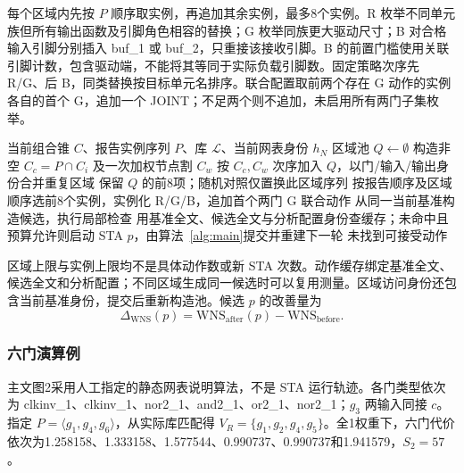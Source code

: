\documentclass[twocolumn,10pt,fontset=windows]{ctexart}
\renewcommand{\eqref}[1]{\textup{（\ref{#1}）}}
\begin{document}
每个区域内先按 $P$ 顺序取实例，再追加其余实例，最多8个实例。R 枚举不同单元族但所有输出函数及引脚角色相容的替换；G 枚举同族更大驱动尺寸；B 对合格输入引脚分别插入 buf\_1 或 buf\_2，只重接该接收引脚。B 的前置门槛使用关联引脚计数，包含驱动端，不能将其等同于实际负载引脚数。固定策略次序先 R/G、后 B，同类替换按目标单元名排序。联合配置取前两个存在 G 动作的实例各自的首个 G，追加一个 JOINT；不足两个则不追加，未启用所有两门子集枚举。

\begin{algorithm}[htbp]
\footnotesize
\caption{覆盖优先的区域与动作调度}\label{alg:regions}
\begin{algorithmic}[1]
\Require 当前组合锥 $C$、报告实例序列 $P$、库 $\mathcal L$、当前网表身份 $h_N$
\State 区域池 $Q\gets\emptyset$
  \State 构造非空 $C_c=P\cap C_i$ 及一次加权节点割 $C_w$
  \State 按 $C_c,C_w$ 次序加入 $Q$，以门/输入/输出身份合并重复区域
\EndFor
\State 保留 $Q$ 的前8项；随机对照仅置换此区域序列
  \State 按报告顺序及区域顺序选前8个实例，实例化 R/G/B，追加首个两门 G 联合动作
    \State 从同一当前基准构造候选，执行局部检查
    \State 用基准全文、候选全文与分析配置身份查缓存；未命中且预算允许则启动 STA
    \If{$p$ 满足式~\eqref{eq:accept}及启用的物理门控}
      \State \Return $p$，由算法~\ref{alg:main}提交并重建下一轮
    \EndIf
  \EndFor
\EndFor
\State \Return 未找到可接受动作
\end{algorithmic}
\end{algorithm}

区域上限与实例上限均不是具体动作数或新 STA 次数。动作缓存绑定基准全文、候选全文和分析配置；不同区域生成同一候选时可以复用测量。区域访问身份还包含当前基准身份，提交后重新构造池。候选 $p$ 的改善量为
\begin{equation}\label{eq:dtiming}
\Delta_{\mathrm{WNS}}(p)=\mathrm{WNS}_{\mathrm{after}}(p)-\mathrm{WNS}_{\mathrm{before}}.
\end{equation}

\subsubsection{六门演算例}
主文图2采用人工指定的静态网表说明算法，不是 STA 运行轨迹。各门类型依次为 clkinv\_1、clkinv\_1、nor2\_1、and2\_1、or2\_1、nor2\_1；$g_3$ 两输入同接 $c$。指定 $P=\langle g_1,g_4,g_6\rangle$，从实际库匹配得 $V_R=\{g_1,g_2,g_4,g_5\}$。全1权重下，六门代价依次为1.258158、1.333158、1.577544、0.990737、0.990737和1.941579，$S_2=57$。
\end{document}

